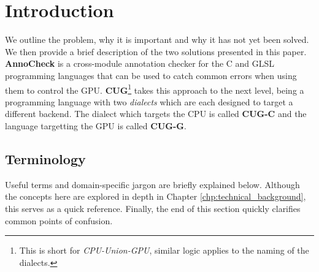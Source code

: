 \documentclass[a4paper,12pt,twoside,openright]{report}
\begin{document}
\pagestyle{empty}
\singlespacing

\onehalfspacing

\singlespacing

\singlespacing


\setcounter{page}{0}
\pagestyle{plain}
\tableofcontents

\onehalfspacing


\chapter{Introduction}
\setcounter{page}{1}

\label{sec:TODO}

We outline the problem, why it is important and why it has not yet been solved.
We then provide a brief description of the two solutions presented in this
paper. \textbf{AnnoCheck} is a cross-module annotation checker for the C and
GLSL programming languages that can be used to catch common errors when using
them to control the GPU. \textbf{CUG}\footnote{This is short for
\textit{CPU-Union-GPU}, similar logic applies to the naming of the dialects.}
takes this approach to the next level, being a programming language with two
\textit{dialects} which are each designed to target a different backend. The
dialect which targets the CPU is called \textbf{CUG-C} and the language
targetting the GPU is called \textbf{CUG-G}.

\section{Terminology}


Useful terms and domain-specific jargon are briefly explained below. Although
the concepts here are explored in depth in Chapter
\ref{chp:technical_background}, this serves as a quick reference. Finally, the
end of this section quickly clarifies common points of confusion.
\end{document}
